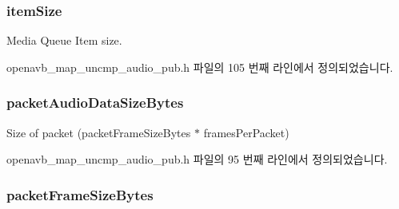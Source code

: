 \subsubsection[{\texorpdfstring{item\+Size}{itemSize}}]{ item\+Size}\hypertarget{structmedia__q__pub__map__uncmp__audio__info__t_a91e248b2730fbe7951ac5d9d3aae1752}{}\label{structmedia__q__pub__map__uncmp__audio__info__t_a91e248b2730fbe7951ac5d9d3aae1752}


Media Queue Item size. 



openavb\+\_\+map\+\_\+uncmp\+\_\+audio\+\_\+pub.\+h 파일의 105 번째 라인에서 정의되었습니다.

\subsubsection[{\texorpdfstring{packet\+Audio\+Data\+Size\+Bytes}{packetAudioDataSizeBytes}}]{ packet\+Audio\+Data\+Size\+Bytes}\hypertarget{structmedia__q__pub__map__uncmp__audio__info__t_a74ea99827baf90850caefe2a10f25721}{}\label{structmedia__q__pub__map__uncmp__audio__info__t_a74ea99827baf90850caefe2a10f25721}


Size of packet (packet\+Frame\+Size\+Bytes $\ast$ frames\+Per\+Packet) 



openavb\+\_\+map\+\_\+uncmp\+\_\+audio\+\_\+pub.\+h 파일의 95 번째 라인에서 정의되었습니다.

\subsubsection[{\texorpdfstring{packet\+Frame\+Size\+Bytes}{packetFrameSizeBytes}}]{ packet\+Frame\+Size\+Bytes}\hypertarget{structmedia__q__pub__map__uncmp__audio__info__t_ac26de86e26ac41388da8721b8bbdc592}{}\label{structmedia__q__pub__map__uncmp__audio__info__t_ac26de86e26ac41388da8721b8bbdc592}


